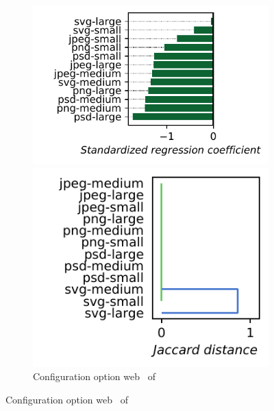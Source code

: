 \begin{figure}
	\begin{subfigure}{0.99\linewidth}
		\begin{minipage}{0.5\linewidth}
			\includegraphics[width=\linewidth]{images/plots/dconvert_web_influences.pdf}
		\end{minipage}
		\begin{minipage}{0.5\linewidth}
			\includegraphics[width=0.8\linewidth]{images/plots/dconvert_web_workloads.pdf}
		\end{minipage}
		\caption{Configuration option \guillemotleft\textsf{web}\guillemotright~ of \dconvert}
		\label{fig:results_rq3_dconvert}
	\end{subfigure}
	

\end{figure}
